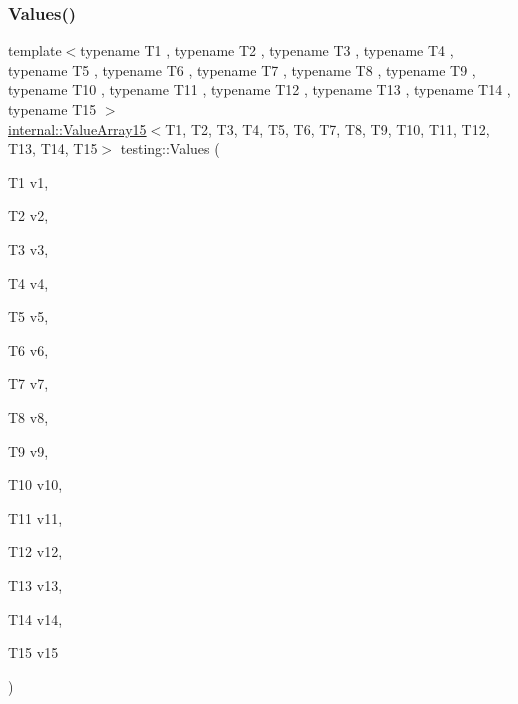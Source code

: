 \subsubsection{\texorpdfstring{Values()}{Values()}\hspace{0.1cm}{\footnotesize\ttfamily [16/51]}}
{\footnotesize\ttfamily template$<$typename T1 , typename T2 , typename T3 , typename T4 , typename T5 , typename T6 , typename T7 , typename T8 , typename T9 , typename T10 , typename T11 , typename T12 , typename T13 , typename T14 , typename T15 $>$ \\
\mbox{\hyperlink{classtesting_1_1internal_1_1_value_array15}{internal\+::\+Value\+Array15}}$<$T1, T2, T3, T4, T5, T6, T7, T8, T9, T10, T11, T12, T13, T14, T15$>$ testing\+::\+Values (\begin{DoxyParamCaption}\item[{T1}]{v1,  }\item[{T2}]{v2,  }\item[{T3}]{v3,  }\item[{T4}]{v4,  }\item[{T5}]{v5,  }\item[{T6}]{v6,  }\item[{T7}]{v7,  }\item[{T8}]{v8,  }\item[{T9}]{v9,  }\item[{T10}]{v10,  }\item[{T11}]{v11,  }\item[{T12}]{v12,  }\item[{T13}]{v13,  }\item[{T14}]{v14,  }\item[{T15}]{v15 }\end{DoxyParamCaption})}

\mbox{\label{namespacetesting_afebcdc503d4a99cae5924523dcfd02e1}} 
